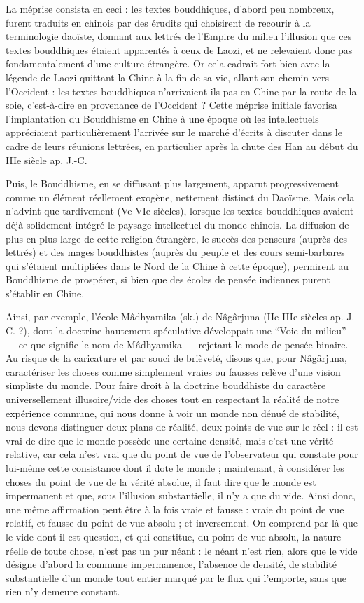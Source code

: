 \documentclass[11pt,a4paper]{article} %
\begin{document}
La méprise consista en ceci : les textes bouddhiques, d'abord peu nombreux, furent traduits en chinois par des érudits qui choisirent de recourir à la terminologie daoïste,
donnant aux lettrés de l'Empire du milieu l'illusion que ces textes bouddhiques étaient
apparentés à ceux de Laozi, et ne relevaient donc pas fondamentalement d'une culture
étrangère.
Or cela cadrait fort bien avec la légende de Laozi quittant la Chine à la fin de
sa vie, allant son chemin vers l'Occident : les textes bouddhiques n'arrivaient-ils pas en
Chine par la route de la soie, c'est-à-dire en provenance de l'Occident ? Cette méprise
initiale favorisa l'implantation du Bouddhisme en Chine à une époque où les intellectuels appréciaient particulièrement l'arrivée sur le marché d'écrits à discuter dans le
cadre de leurs réunions lettrées, en particulier après la chute des Han au début du IIIe
siècle ap. J.-C.

Puis, le Bouddhisme, en se diffusant plus largement, apparut progressivement comme
un élément réellement exogène, nettement distinct du Daoïsme.
Mais cela n'advint que
tardivement (Ve-VIe siècles), lorsque les textes bouddhiques avaient déjà solidement
intégré le paysage intellectuel du monde chinois.
La diffusion de plus en plus large de
cette religion étrangère, le succès des penseurs (auprès des lettrés) et des mages bouddhistes (auprès du peuple et des cours semi-barbares qui s'étaient multipliées dans le
Nord de la Chine à cette époque), permirent au Bouddhisme de prospérer, si bien que
des écoles de pensée indiennes purent s'établir en Chine.

Ainsi, par exemple, l'école Mâdhyamika (sk.) de Nâgârjuna (IIe-IIIe siècles ap. J.-C. ?),
dont la doctrine hautement spéculative développait une ``Voie du milieu'' --- ce que signifie le nom de Mâdhyamika --- rejetant le mode de pensée binaire.
Au risque de la
caricature et par souci de brièveté, disons que, pour Nâgârjuna, caractériser les choses
comme simplement vraies ou fausses relève d'une vision simpliste du monde.
Pour faire droit à la doctrine bouddhiste du caractère universellement illusoire/vide des choses tout
en respectant la réalité de notre expérience commune, qui nous donne à voir un monde
non dénué de stabilité, nous devons distinguer deux plans de réalité, deux points de vue
sur le réel : il est vrai de dire que le monde possède une certaine densité, mais c'est une
vérité relative, car cela n'est vrai que du point de vue de l'observateur qui constate pour
lui-même cette consistance dont il dote le monde ; maintenant, à considérer les choses
du point de vue de la vérité absolue, il faut dire que le monde est impermanent et que,
sous l'illusion substantielle, il n'y a que du vide.
Ainsi donc, une même affirmation peut
être à la fois vraie et fausse : vraie du point de vue relatif, et fausse du point de vue absolu ; et inversement.
On comprend par là que le vide dont il est question, et qui
constitue, du point de vue absolu, la nature réelle de toute chose, n'est pas un pur néant :
le néant n'est rien, alors que le vide désigne d'abord la commune impermanence,
l'absence de densité, de stabilité substantielle d'un monde tout entier marqué par le flux
qui l'emporte, sans que rien n'y demeure constant.
\end{document}
